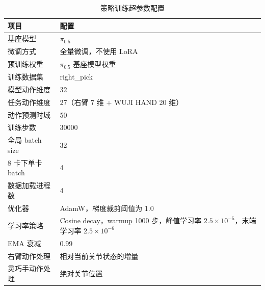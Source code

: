 \begin{table}[htb]
    \centering
    \caption{策略训练超参数配置}\label{tab:pi05_training_config}
    \begin{tabular}{lp{}}
        \hline
        项目 & 配置 \\
        \hline
        基座模型 & $\pi_{0.5}$ \\
        微调方式 & 全量微调，不使用 LoRA \\
        预训练权重 & $\pi_{0.5}$ 基座模型权重 \\
        训练数据集 & right\_pick \\
        模型动作维度 & 32 \\
        任务动作维度 & 27（右臂 7 维 + WUJI HAND 20 维）\\
        动作预测时域 & 50 \\
        训练步数 & 30000 \\
        全局 batch size & 32 \\
        8 卡下单卡 batch & 4 \\
        数据加载进程数 & 4 \\
        优化器 & AdamW，梯度裁剪阈值为 1.0 \\
        学习率策略 & Cosine decay，warmup 1000 步，峰值学习率 $2.5\times10^{-5}$，末端学习率 $2.5\times10^{-6}$ \\
        EMA 衰减 & 0.99 \\
        右臂动作处理 & 相对当前关节状态的增量 \\
        灵巧手动作处理 & 绝对关节位置 \\
        \hline
    \end{tabular}
\end{table}
